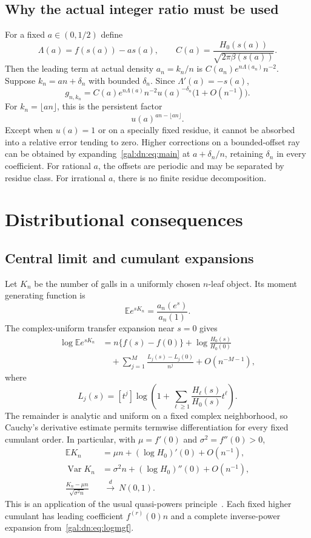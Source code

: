 \documentclass[11pt,letterpaper]{article}
\numberwithin{equation}{section}
\theoremstyle{definition}\newtheorem{definition}[theorem]{Definition}
\theoremstyle{remark}\newtheorem{remark}[theorem]{Remark}
\newcommand{\E}{\mathbb E}
\newcommand{\Var}{\operatorname{Var}}
\begin{document}
\subsection{Why the actual integer ratio must be used}\label{gal:dn:sec:floor}
For a fixed $a\in(0,1/2)$ define
\[
 \Lambda(a)=f(s(a))-a s(a),\qquad
 C(a)=\frac{H_0(s(a))}{\sqrt{2\pi\beta(s(a))}}.
\]
Then the leading term at actual density $a_n=k_n/n$ is $C(a_n)e^{n\Lambda(a_n)}n^{-2}$. Suppose $k_n=an+\delta_n$ with bounded $\delta_n$. Since $\Lambda'(a)=-s(a)$,
\begin{equation}\label{gal:dn:eq:floorfactor}
 g_{n,k_n}=C(a)e^{n\Lambda(a)}n^{-2}
              u(a)^{-\delta_n}\bigl(1+O(n^{-1})\bigr).
\end{equation}
For $k_n=\lfloor an\rfloor$, this is the persistent factor
\[
 u(a)^{an-\lfloor an\rfloor}.
\]
Except when $u(a)=1$ or on a specially fixed residue, it cannot be absorbed into a relative error tending to zero. Higher corrections on a bounded-offset ray can be obtained by expanding~\eqref{gal:dn:eq:main} at $a+\delta_n/n$, retaining $\delta_n$ in every coefficient. For rational $a$, the offsets are periodic and may be separated by residue class. For irrational $a$, there is no finite residue decomposition.

\section{Distributional consequences}\label{gal:dn:sec:distribution}
\subsection{Central limit and cumulant expansions}
Let $K_n$ be the number of galls in a uniformly chosen $n$-leaf object. Its moment generating function is
\[
 \E e^{sK_n}=\frac{a_n(e^s)}{a_n(1)}.
\]
The complex-uniform transfer expansion near $s=0$ gives
\begin{equation}\label{gal:dn:eq:logmgf}
\begin{split}
 \log\E e^{sK_n}
 &=n\{f(s)-f(0)\}+\log\frac{H_0(s)}{H_0(0)}\\
 &\quad+\sum_{j=1}^M\frac{L_j(s)-L_j(0)}{n^j}
 +O(n^{-M-1}),
\end{split}
\end{equation}
where
\[
 L_j(s)=[t^j]\log\left(1+\sum_{\ell\geq1}\frac{H_\ell(s)}{H_0(s)}t^\ell\right).
\]
The remainder is analytic and uniform on a fixed complex neighborhood, so Cauchy's derivative estimate permits termwise differentiation for every fixed cumulant order. In particular, with $\mu=f'(0)$ and $\sigma^2=f''(0)>0$,
\begin{align}
 \E K_n&=\mu n+(\log H_0)'(0)+O(n^{-1}),\label{gal:dn:eq:mean}\\
 \Var K_n&=\sigma^2n+(\log H_0)''(0)+O(n^{-1}),\label{gal:dn:eq:var}\\
 \frac{K_n-\mu n}{\sqrt{\sigma^2n}}&\ \xrightarrow{\ d\ }\ N(0,1).\label{gal:dn:eq:clt}
\end{align}
This is an application of the usual quasi-powers principle~\cite{FS,Drmota}. Each fixed higher cumulant has leading coefficient $f^{(r)}(0)n$ and a complete inverse-power expansion from~\eqref{gal:dn:eq:logmgf}.
\end{document}
